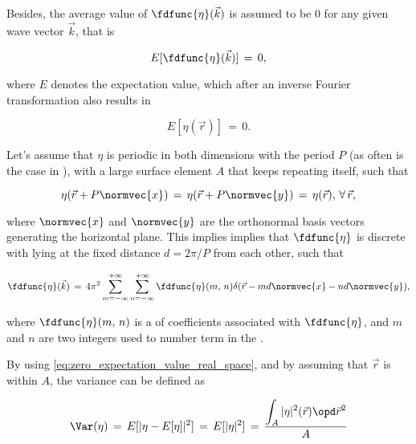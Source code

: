 {Besides, the average value of $\fdfunc{\eta}(\vec{k})$ is assumed to be 0 for any given wave vector $\vec{k}$, that is

\begin{equation} \label{eq:zero_expectation_value_reciprocal_space}
E[\fdfunc{\eta}(\vec{k})] \,=\, 0,
\end{equation}

where $E$ denotes the expectation value, which after an inverse Fourier transformation also results in 

\begin{equation} \label{eq:zero_expectation_value_real_space}
E[\eta(\vec{r})] \,=\, 0.
\end{equation}

Let's assume that $\eta$ is periodic in both dimensions with the period $P$ (as often is the case in ), with a large surface element $A$ that keeps repeating itself, such that

\begin{equation} \label{eq:water_surface_periodicity}
\eta(\vec{r}+P\normvec{x}) \,=\, \eta(\vec{r}+P\normvec{y}) \,=\, \eta(\vec{r}),\,\forall\,\vec{r},
\end{equation}

where $\normvec{x}$ and $\normvec{y}$ are the orthonormal basis vectors generating the horizontal plane. This implies implies that $\fdfunc{\eta}$ is discrete with  lying at the fixed distance $d = 2\pi/P$ from each other, such that

\begin{equation}
\fdfunc{\eta}(\vec{k}) \,=\, 4\pi^2\sum_{m=-\infty}^{+\infty}\sum_{n=-\infty}^{+\infty} \fdfunc{\eta}(m,\,n)\delta(\vec{r} - md\normvec{x} - nd\normvec{y}),
\end{equation}

where $\fdfunc{\eta}(m,\,n)$ is a \twodimensional \sequence of coefficients associated with $\fdfunc{\eta}$, and $m$ and $n$ are two integers used to number term in the \series.

By using \eqref{eq:zero_expectation_value_real_space}, and by assuming that $\vec{r}$ is  within $A$, the variance can be defined as

\begin{equation}
\Var(\eta) \,=\, E[|\eta - E[\eta]|^2] \,=\, E[|\eta|^2] \,=\, \frac{\displaystyle \int_A|\eta|^2(\vec{r})\opd\vec{r}^2}{A}
\end{equation}

}
